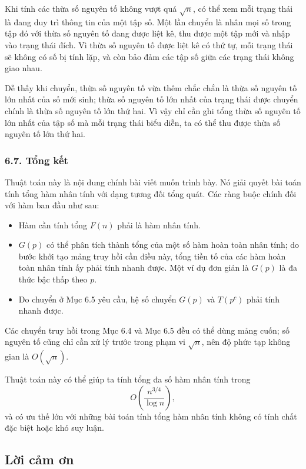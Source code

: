 \documentclass[11pt]{article}
\begin{document}
Khi tính các thừa số nguyên tố không vượt quá \(\sqrt n\), có thể xem mỗi
trạng thái là đang duy trì thông tin của một tập số. Một lần chuyển là nhân
mọi số trong tập đó với thừa số nguyên tố đang được liệt kê, thu được một tập
mới và nhập vào trạng thái đích. Vì thừa số nguyên tố được liệt kê có thứ tự,
mỗi trạng thái sẽ không có số bị tính lặp, và còn bảo đảm các tập số giữa các
trạng thái không giao nhau.

Dễ thấy khi chuyển, thừa số nguyên tố vừa thêm chắc chắn là thừa số nguyên tố
lớn nhất của số mới sinh; thừa số nguyên tố lớn nhất của trạng thái được
chuyển chính là thừa số nguyên tố lớn thứ hai. Vì vậy chỉ cần ghi tổng thừa
số nguyên tố lớn nhất của tập số mà mỗi trạng thái biểu diễn, ta có thể thu
được thừa số nguyên tố lớn thứ hai.

\subsubsection*{6.7. Tổng kết}

Thuật toán này là nội dung chính bài viết muốn trình bày. Nó giải quyết bài
toán tính tổng hàm nhân tính với dạng tương đối tổng quát. Các ràng buộc chính
đối với hàm ban đầu như sau:
\begin{itemize}
  \item Hàm cần tính tổng \(F(n)\) phải là hàm nhân tính.
  \item \(G(p)\) có thể phân tích thành tổng của một số hàm hoàn toàn nhân
  tính; do bước khởi tạo mảng truy hồi cần điều này, tổng tiền tố của các hàm
  hoàn toàn nhân tính ấy phải tính nhanh được. Một ví dụ đơn giản là \(G(p)\)
  là đa thức bậc thấp theo \(p\).
  \item Do chuyển ở Mục 6.5 yêu cầu, hệ số chuyển \(G(p)\) và \(T(p^c)\) phải
  tính nhanh được.
\end{itemize}

Các chuyển truy hồi trong Mục 6.4 và Mục 6.5 đều có thể dùng mảng cuốn; số
nguyên tố cũng chỉ cần xử lý trước trong phạm vi \(\sqrt n\), nên độ phức tạp
không gian là \(O(\sqrt n)\).

Thuật toán này có thể giúp ta tính tổng đa số hàm nhân tính trong
\[
  O\left(\frac{n^{3/4}}{\log n}\right),
\]
và có ưu thế lớn với những bài toán tính tổng hàm nhân tính không có tính chất
đặc biệt hoặc khó suy luận.

\subsection*{Lời cảm ơn}
\end{document}

